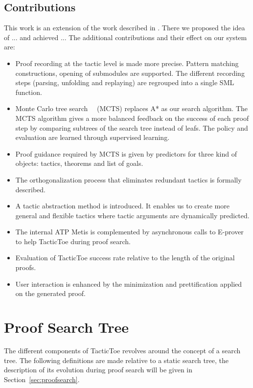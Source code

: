 \documentclass[runningheads,a4paper,draft]{svjour3}
\newcommand{\todoi}[1]{\todo[inline]{#1}}
\def\eprover{\textsf{E-prover}\xspace}
\def\sml{\textsf{SML}\xspace}
\def\metis{\textsf{Metis}\xspace}
\def\tactictoe{\textsf{TacticToe}\xspace}
\begin{document}
\subsection{Contributions}
This work is an extension of the work described in \cite{tgckju-lpar17}.
There we proposed the idea of ... and achieved ...
The additional contributions and their effect on our system are:

\begin{itemize}
\item Proof recording at the tactic level is made more precise. Pattern 
matching constructions, opening of submodules are supported. The different 
recording steps (parsing, unfolding and replaying) are regrouped into a single 
\sml function.
\item Monte Carlo tree search~~\cite{montecarlo} (MCTS) replaces A* as our 
search algorithm. The MCTS algorithm gives a more balanced feedback on 
the success of 
each proof step by
comparing subtrees of the search tree instead of leafs. The policy and 
evaluation are learned 
through supervised learning.
\item Proof guidance required by MCTS is given by predictors for 
three kind of objects: tactics, theorems and list of goals.
\item The orthogonalization process that eliminates redundant tactics is 
formally described.
\item A tactic abstraction method is introduced. It enables us to create 
more general and flexible tactics where tactic arguments are dynamically 
predicted.
\item The internal ATP \metis is complemented 
by asynchronous calls to \eprover to help \tactictoe during proof search.
\todoi{More on evaluation??}
\item Evaluation of \tactictoe success rate relative to 
the length of the original proofs.
\item User interaction is enhanced by the minimization and prettification 
applied on the generated proof.
\end{itemize}


\section{Proof Search Tree}\label{sec:prelim}
  
The different components of \tactictoe revolves around the concept of a 
search tree. The following definitions are made relative to a static search 
tree, the description of its evolution during proof search will be given in 
Section~\ref{sec:proofsearch}.
\end{document}
